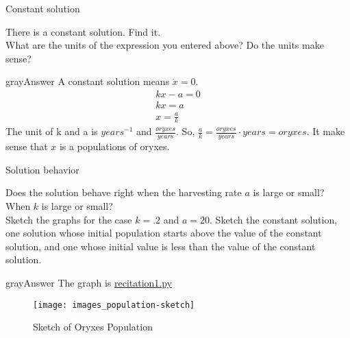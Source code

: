 \begin{problem}
  Constant solution
\end{problem}
There is a constant solution. Find it.\\
What are the units of the expression you entered above? Do the units make sense?
\begin{mybox}{gray}{Answer}
  A constant solution means $\dot x = 0$.
  \begin{equation*}
    \begin{aligned}
      kx - a = 0 \\
      kx = a\\
      x = \frac{a}{k}
    \end{aligned}
  \end{equation*}
  The unit of k and a is $years^{-1}$ and $\displaystyle \frac{oryxes}{years}$.
  So, $\displaystyle \frac{a}{k} = \frac{oryxes}{years} \cdot years = oryxes$.
  It make sense that $x$ is a populations of oryxes.   
\end{mybox}

\begin{problem}
  Solution behavior
\end{problem}
Does the solution behave right when the harvesting rate $a$ is large or small? When $k$ is large or small?\\
Sketch the graphs for the case $k = .2$ and $a = 20$.
Sketch the constant solution, one solution whose initial population starts above the value of the constant solution, and one whose initial value is less than the value of the constant solution.

\begin{mybox}{gray}{Answer}
  The graph is \href{run:../source_code/recitation1.py}{recitation1.py}
\end{mybox}
\begin{figure}[ht!]
  \centering
  \texttt{[image: images\_population-sketch]}
  \caption{Sketch of Oryxes Population}
\end{figure}

